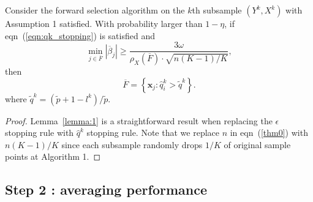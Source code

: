 \documentclass[11pt,review,authoryear]{elsarticle}
\begin{document}
\begin{appendices}
\begin{lemma}
  Consider the forward selection algorithm on the $k$th subsample $\left(Y^{k},X^{k}\right)$ with Assumption 1 satisfied. With probability larger than $1-\eta$, if eqn~(\ref{eqn:qk_stopping}) is satisfied and
  \begin{displaymath}
      \min_{j\in\overline{F}}\left|\overline{\beta}_{j}\right|\geqslant\frac{3\omega}{\rho_{X}\left(\overline{F}\right)\cdot\sqrt{n\left(K-1\right)/K}},
  \end{displaymath}
  then 
  \begin{displaymath}
      \overline{F}=\left\{ \mathbf{x}_{j}:\widehat{q}_{i}^{k}>\widetilde{q}^{k}\right\}.
  \end{displaymath}
  where $\widetilde{q}^k = \left(\widetilde{p} + 1 - l^k\right) / \widetilde{p}$.
  \label{lemma:1}
\end{lemma}

\begin{proof}
    Lemma~\ref{lemma:1} is a straightforward result when replacing the $\epsilon$ stopping rule with $\widehat{q}^k$ stopping rule. Note that we replace $n$ in eqn~(\ref{thm0}) with $n\left(K-1\right)/K$ since each subsample randomly drops $1/K$ of original sample points at Algorithm 1.
\end{proof}
\medskip


\subsection*{Step 2 : averaging performance}


\end{appendices}
\end{document}
